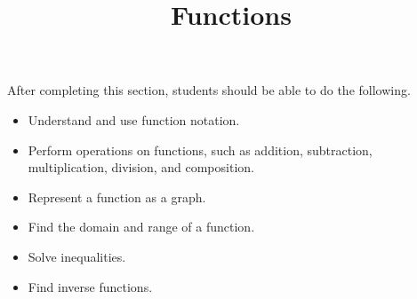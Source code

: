 \documentclass{ximera}
\title{Functions}
\begin{document}
\begin{abstract}
\end{abstract}

\maketitle

\begin{sectionOutcomes}

After completing this section, students should be able to do the following.

\begin{itemize}
	\item Understand and use function notation.
	\item Perform operations on functions, such as addition, subtraction, multiplication, division, and composition.
	\item Represent a function as a graph.
	\item Find the domain and range of a function.
	\item Solve inequalities.
	\item Find inverse functions.
\end{itemize}

\end{sectionOutcomes}
\end{document}
